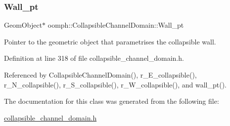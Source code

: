 \mbox{\label{classoomph_1_1CollapsibleChannelDomain_a6f1ef65c47937800e35477863b1439ab}} 
\subsubsection{\texorpdfstring{Wall\+\_\+pt}{Wall\_pt}}
{\footnotesize\ttfamily Geom\+Object$\ast$ oomph\+::\+Collapsible\+Channel\+Domain\+::\+Wall\+\_\+pt\hspace{0.3cm}{\ttfamily [private]}}



Pointer to the geometric object that parametrises the collapsible wall. 



Definition at line 318 of file collapsible\+\_\+channel\+\_\+domain.\+h.



Referenced by Collapsible\+Channel\+Domain(), r\+\_\+\+E\+\_\+collapsible(), r\+\_\+\+N\+\_\+collapsible(), r\+\_\+\+S\+\_\+collapsible(), r\+\_\+\+W\+\_\+collapsible(), and wall\+\_\+pt().



The documentation for this class was generated from the following file\+:\begin{DoxyCompactItemize}
\item 
\hyperlink{collapsible__channel__domain_8h}{collapsible\+\_\+channel\+\_\+domain.\+h}\end{DoxyCompactItemize}
